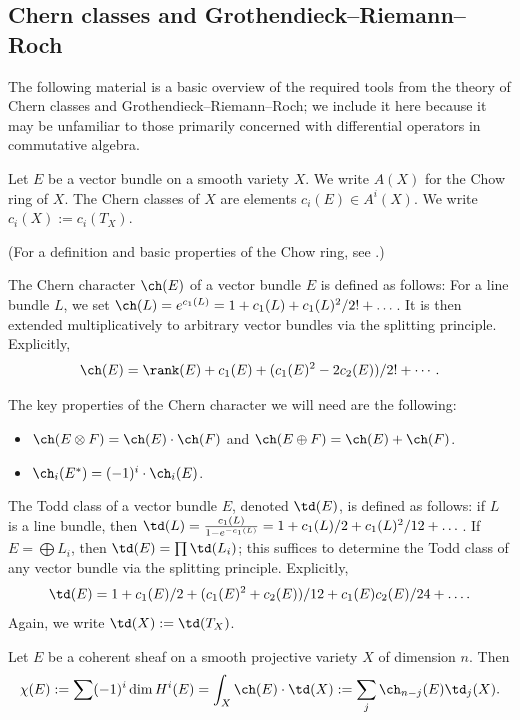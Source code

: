 \documentclass{article}
\numberwithin{equation}{section}
\theoremstyle{theorem}
\numberwithin{thm}{section}
\theoremstyle{definition}
\begin{document}
\subsection{Chern classes and Grothendieck--Riemann--Roch}

The following material is a basic overview of the required tools from the theory of Chern classes and Grothendieck--Riemann--Roch; we include it here because it may be unfamiliar to those primarily concerned with differential operators in commutative algebra.

\begin{dfn}
Let $E$ be a vector bundle on a smooth variety $X$. We write $A(X)$ for the Chow ring of $X$.
The Chern classes of $X$ are elements $c_i(E)\in A^i(X)$.
We write $c_i(X):=c_i(T_X)$.
\end{dfn}

(For a definition and basic properties of the Chow ring, see \cite[Appendix~A]{Hartshorne}.)

\begin{dfn}
The Chern character $\ch(E)$ of a vector bundle $E$ is defined as follows:
For a line bundle $L$, we set $\ch(L)=e^{c_1(L)}=1+c_1(L)+c_1(L)^2/2!+\dots$. It is then extended multiplicatively to arbitrary vector bundles via the splitting principle.
Explicitly,
$$\ch(E)=\rank(E)+c_1(E)+(c_1(E)^2-2c_2(E))/2!+\cdots.$$
\end{dfn}

The key properties of the Chern character we will need are the following:
\begin{itemize}
\item $\ch(E\otimes F)=\ch(E)\cdot \ch(F)$ and $\ch(E\oplus F)=\ch(E)+\ch(F)$.
\item $\ch_i(E^*)=(-1)^i\cdot \ch_i(E)$.
\end{itemize}


\begin{dfn}
The Todd class of a vector bundle $E$, denoted $\td(E)$, is defined as follows: if $L$ is a line bundle, then $\td(L)=\frac{c_1(L)}{1-e^{-c_1(L)}}=1+c_1(L)/2+c_1(L)^2/12+\dots$. If $E=\bigoplus L_i$, then $\td(E)=\prod \td(L_i)$; this suffices to determine the Todd class of any vector bundle via the splitting principle.
Explicitly, 
$$
\td(E)=1+c_1(E)/2
+(c_1(E)^2+c_2(E))/12
+c_1(E)c_2(E)/24+\dots.
$$
Again, we write $\td(X):=\td(T_X)$.
\end{dfn}



\begin{thm}
Let $E$ be a coherent sheaf on a smooth projective variety $X$ of dimension $n$. Then
$$
\chi(E):=\sum (-1)^i \dim H^i(E) = \int_X \ch(E)\cdot \td(X) :=\sum_{j} \ch_{n-j}(E)\td_j(X).
$$
\end{thm}
\end{document}
